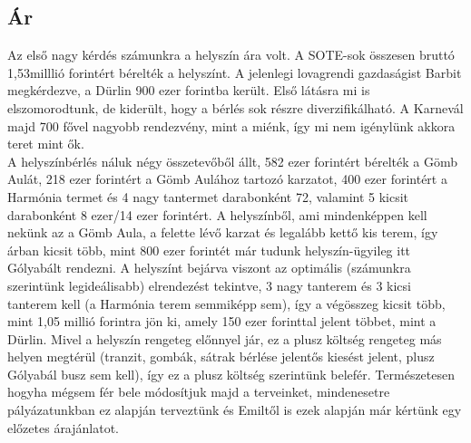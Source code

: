 \subsection{Ár}
\hspace{2mm} Az első nagy kérdés számunkra a helyszín ára volt. A SOTE-sok összesen bruttó 1,53milllió forintért bérelték a helyszínt. A jelenlegi lovagrendi gazdaságist Barbit megkérdezve, a Dürlin 900 ezer forintba került.  Első látásra mi is elszomorodtunk, de kiderült, hogy a bérlés sok részre diverzifikálható. A Karnevál majd 700 fővel nagyobb rendezvény, mint a miénk, így mi nem igénylünk akkora teret mint ők.\\
\indent A helyszínbérlés náluk négy összetevőből állt, 582 ezer forintért bérelték a Gömb Aulát, 218 ezer forintért a Gömb Aulához tartozó karzatot, 400 ezer forintért a Harmónia termet és 4 nagy tantermet darabonként 72, valamint 5 kicsit darabonként 8 ezer/14 ezer forintért. A helyszínből, ami mindenképpen kell nekünk az a Gömb Aula, a felette lévő karzat és legalább kettő kis terem, így árban kicsit több, mint 800 ezer forintét már tudunk helyszín-ügyileg itt Gólyabált rendezni.  A helyszínt bejárva viszont az optimális (számunkra szerintünk legideálisabb) elrendezést tekintve, 3 nagy tanterem és 3 kicsi tanterem kell (a Harmónia terem semmiképp sem), így a végösszeg kicsit több, mint 1,05 millió forintra jön ki, amely 150 ezer forinttal jelent többet, mint a Dürlin. Mivel a helyszín rengeteg előnnyel jár, ez a plusz költség rengeteg más helyen megtérül (tranzit, gombák, sátrak bérlése jelentős kiesést jelent, plusz Gólyabál busz sem kell), így ez a plusz költség szerintünk belefér. Természetesen hogyha mégsem fér bele módosítjuk majd a terveinket, mindenesetre pályázatunkban ez alapján terveztünk és Emiltől is ezek alapján már kértünk egy előzetes árajánlatot.

